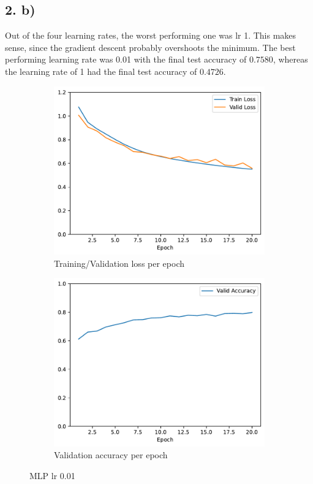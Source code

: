 \documentclass[11pt]{article}
\begin{document}
\subsection{2. b)}
Out of the four learning rates, the worst performing one was lr 1. This makes sense, since the gradient descent probably overshoots the minimum.
The best performing learning rate was 0.01 with the final test accuracy of $0.7580$, whereas the learning rate of 1 had the final test accuracy of $0.4726$.

\begin{figure}[h!]
\centering
\begin{subfigure}{.5\textwidth}
  \centering
  \includegraphics[width=.9\linewidth]{plots/mlp-training-loss-batch-16-lr-0.01-epochs-20-hidden-200-dropout-0-l2-0-layers-1-act-relu-opt-sgd}
  \caption{Training/Validation loss per epoch}
\end{subfigure}%
\begin{subfigure}{.5\textwidth}
  \centering
  \includegraphics[width=.9\linewidth]{plots/mlp-validation-accuracy-batch-16-lr-0.01-epochs-20-hidden-200-dropout-0-l2-0-layers-1-act-relu-opt-sgd}
  \caption{Validation accuracy per epoch}
\end{subfigure}
\caption{MLP lr 0.01}
\label{fig:MLP_lr_0.01}
\end{figure}
\end{document}

